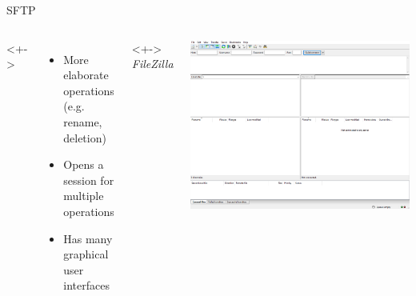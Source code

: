 \documentclass[10pt, graphics, aspectratio=169, table]{beamer}
\begin{document}
\begin{frame}[fragile]{SFTP}
	\begin{columns}
	<+->
		\begin{itemize}
			\item
				More elaborate operations\\
				(e.g. rename, deletion)
			\item Opens a session for multiple operations
			\item Has many graphical user interfaces
		\end{itemize}
	<+->
		\centering
		\emph{FileZilla}	 \cite{filezilla}
		\vspace{1ex}

		\includegraphics[width=\textwidth]{img/filezilla.png}
	\end{columns}
\end{frame}
\end{document}
